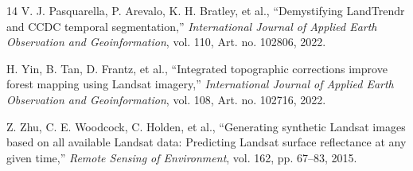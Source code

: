 \documentclass[letterpaper,journal]{IEEEtran}
\begin{document}
\begin{thebibliography}{14}
V. J. Pasquarella, P. Arevalo, K. H. Bratley, et al., ``Demystifying LandTrendr and CCDC temporal segmentation,'' \textit{International Journal of Applied Earth Observation and Geoinformation}, vol. 110, Art. no. 102806, 2022.

H. Yin, B. Tan, D. Frantz, et al., ``Integrated topographic corrections improve forest mapping using Landsat imagery,'' \textit{International Journal of Applied Earth Observation and Geoinformation}, vol. 108, Art. no. 102716, 2022.

Z. Zhu, C. E. Woodcock, C. Holden, et al., ``Generating synthetic Landsat images based on all available Landsat data: Predicting Landsat surface reflectance at any given time,'' \textit{Remote Sensing of Environment}, vol. 162, pp. 67--83, 2015.

\end{thebibliography}
\end{document}
